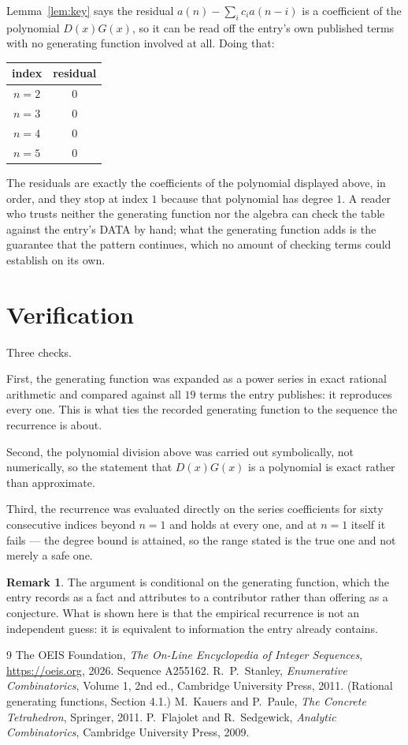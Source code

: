 \documentclass[11pt,a4paper]{article}
\theoremstyle{plain}
\theoremstyle{definition}
\newtheorem{remark}[theorem]{Remark}
\begin{document}
Lemma~\ref{lem:key} says the residual $a(n)-\sum_ic_ia(n-i)$ is a coefficient of the
polynomial $D(x)G(x)$, so it can be read off the entry's own published terms with no
generating function involved at all. Doing that:
\begin{center}
\begin{tabular}{cc}
index & residual \\ \hline
$n=2$ & $0$ \\
$n=3$ & $0$ \\
$n=4$ & $0$ \\
$n=5$ & $0$
\end{tabular}
\end{center}
The residuals are exactly the coefficients of the polynomial displayed above, in order, and
they stop at index $1$ because that polynomial has degree $1$. A reader who trusts
neither the generating function nor the algebra can check the table against the entry's DATA
by hand; what the generating function adds is the guarantee that the pattern continues, which
no amount of checking terms could establish on its own.

\section{Verification}

Three checks.

First, the generating function was expanded as a power series in exact rational arithmetic and
compared against all $19$ terms the entry publishes: it reproduces every one. This is
what ties the recorded generating function to the sequence the recurrence is about.

Second, the polynomial division above was carried out symbolically, not numerically, so the
statement that $D(x)G(x)$ is a polynomial is exact rather than approximate.

Third, the recurrence was evaluated directly on the series coefficients for sixty consecutive
indices beyond $n=1$ and holds at every one, and at $n=1$ itself it fails --- the
degree bound is attained, so the range stated is the true one and not merely a safe one.

\begin{remark}
The argument is conditional on the generating function, which the entry records as a fact and
attributes to a contributor rather than offering as a conjecture. What is shown here is that
the empirical recurrence is not an independent guess: it is equivalent to information the
entry already contains.
\end{remark}

\begin{thebibliography}{9}
 The OEIS Foundation, \emph{The On-Line Encyclopedia of Integer
Sequences}, \url{https://oeis.org}, 2026. Sequence A255162.
 R.~P.~Stanley, \emph{Enumerative Combinatorics}, Volume 1, 2nd ed.,
Cambridge University Press, 2011. (Rational generating functions, Section 4.1.)
 M.~Kauers and P.~Paule, \emph{The Concrete Tetrahedron}, Springer, 2011.
 P.~Flajolet and R.~Sedgewick, \emph{Analytic Combinatorics}, Cambridge
University Press, 2009.
\end{thebibliography}
\end{document}
